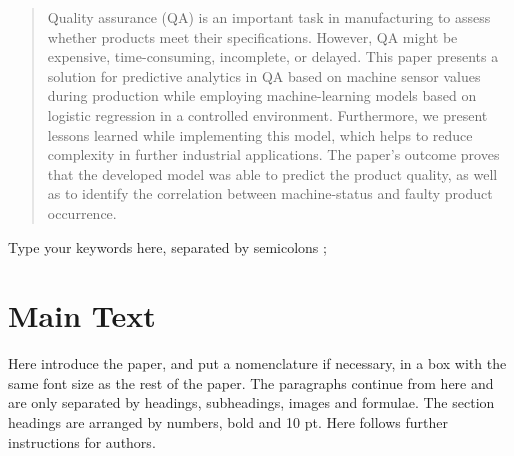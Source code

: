 \documentclass[5p,times,procedia]{elsarticle}
\begin{document}
\begin{frontmatter}
\begin{abstract}
Quality assurance (QA) is an important task in manufacturing to assess whether products 
meet their specifications. However, QA might be expensive, time-consuming, incomplete, or delayed.
This paper presents a solution for predictive analytics in QA based on machine sensor values during
production while employing machine-learning models based on logistic regression in a controlled environment. Furthermore, we present lessons learned while implementing this model, which helps to reduce complexity in further industrial applications. The paper’s outcome proves that the developed model was able to predict the product quality, as well as to identify the correlation between machine-status and faulty product occurrence.
\end{abstract}

\begin{keyword}
Type your keywords here, separated by semicolons ; 




\end{keyword}

\end{frontmatter}



\section{Main Text}
\label{main}

Here introduce the paper, and put a nomenclature if necessary, in a box with the same font size as the rest of the paper. The paragraphs continue from here and are only separated by headings, subheadings, images and formulae. The section headings are arranged by numbers, bold and 10 pt. Here follows further instructions for authors.

\vspace*{8pt}
\begin{nomenclature}
\begin{deflist}[A]
\end{deflist}
\end{nomenclature}\vskip24pt
\end{document}
